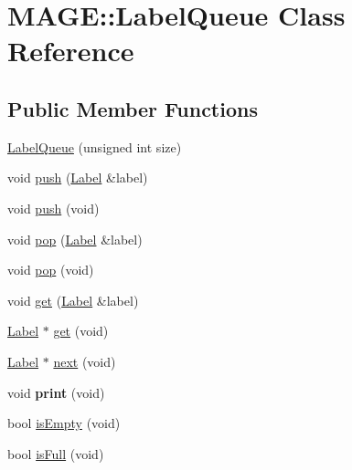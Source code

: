 \hypertarget{class_m_a_g_e_1_1_label_queue}{\section{M\-A\-G\-E\-:\-:Label\-Queue Class Reference}
\label{class_m_a_g_e_1_1_label_queue}
}
\subsection*{Public Member Functions}
\begin{DoxyCompactItemize}
\item 
\hyperlink{class_m_a_g_e_1_1_label_queue_a5d69bbec1eefe9fccd34a14802d18e33}{Label\-Queue} (unsigned int size)
\item 
void \hyperlink{class_m_a_g_e_1_1_label_queue_abd3acda693815cbb59cc3a084d9c0829}{push} (\hyperlink{class_m_a_g_e_1_1_label}{Label} \&label)
\item 
void \hyperlink{class_m_a_g_e_1_1_label_queue_afc70a0500860585adbd8924c8d56b956}{push} (void)
\item 
void \hyperlink{class_m_a_g_e_1_1_label_queue_a096711daf22ea9b75b2049f2be70aea3}{pop} (\hyperlink{class_m_a_g_e_1_1_label}{Label} \&label)
\item 
void \hyperlink{class_m_a_g_e_1_1_label_queue_a71ab29606a69856b6d3a6015267e31d7}{pop} (void)
\item 
void \hyperlink{class_m_a_g_e_1_1_label_queue_a1adf91ffe03fdcf9b1746e4003b21c51}{get} (\hyperlink{class_m_a_g_e_1_1_label}{Label} \&label)
\item 
\hyperlink{class_m_a_g_e_1_1_label}{Label} $\ast$ \hyperlink{class_m_a_g_e_1_1_label_queue_aa6ac0d09888731bd508e63bb0230297a}{get} (void)
\item 
\hyperlink{class_m_a_g_e_1_1_label}{Label} $\ast$ \hyperlink{class_m_a_g_e_1_1_label_queue_ad601c5c5034dd42fbbe511d4fb715b56}{next} (void)
\item 
\hypertarget{class_m_a_g_e_1_1_label_queue_a0fcea608643f081bd3044706ae98142d}{void {\bfseries print} (void)}\label{class_m_a_g_e_1_1_label_queue_a0fcea608643f081bd3044706ae98142d}

\item 
bool \hyperlink{class_m_a_g_e_1_1_label_queue_a0a2d45cf42d8ba62240d544b61f690c8}{is\-Empty} (void)
\item 
bool \hyperlink{class_m_a_g_e_1_1_label_queue_ac55a268122abcec371db89ecacdfd94e}{is\-Full} (void)
\end{DoxyCompactItemize}
